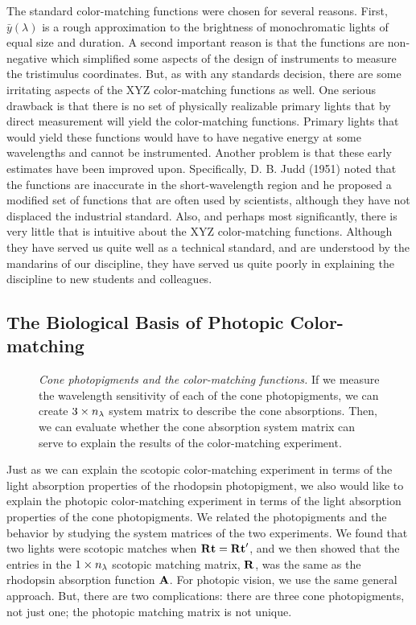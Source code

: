 The standard color-matching
functions were chosen for several reasons.
First, $\bar{y}(\lambda)$ is a rough approximation
to the brightness of monochromatic lights of equal size and duration.
A second important reason is that the
functions are non-negative
which simplified some aspects of the
design of instruments to measure the tristimulus coordinates.
But, as with any standards decision, there are some
irritating aspects of the XYZ color-matching functions
as well.
One serious drawback is that
there is no set of physically realizable primary lights
that by direct measurement will yield the color-matching functions.
Primary lights that would yield these functions
would have to have negative energy at some wavelengths
and cannot be instrumented.
Another problem is that these early estimates have been
improved upon.
Specifically, D. B. Judd (1951) noted that the functions are
inaccurate in the short-wavelength region and he proposed a
modified set of functions that are often used by scientists,
although they have not displaced the industrial standard.
Also, and perhaps most significantly,
there is very little that is intuitive about the XYZ
color-matching functions.
Although they have served us quite well as a technical standard,
and are understood by the mandarins of our discipline,
they have served us quite poorly in explaining the discipline
to new students and colleagues.

\subsection*{The Biological Basis of Photopic Color-matching}

\begin{figure}
\centerline {
}
\caption[Photoreceptors and Color Matching]{
{\em Cone photopigments and the color-matching functions.}
If we measure the wavelength sensitivity of
each of the cone photopigments, we can
create $3 \times \mbox{$n_\lambda$}$ system matrix to describe the cone absorptions.
Then, we can evaluate whether the
cone absorption system matrix can serve 
to explain the results of the color-matching experiment.
}
\label{f3:photoreceptor.mat}
\end{figure}
Just as we can explain the scotopic color-matching experiment
in terms of the light absorption properties of the rhodopsin photopigment,
we also would like to explain the photopic color-matching experiment
in terms of the light absorption properties of the cone photopigments.
We related the photopigments and the behavior by studying
the system matrices of the two experiments.
We found that two lights were scotopic matches when
$\mbox{$\bf R$} \mbox{${\bf t}$} = \mbox{$\bf R$} \mbox{${\bf t}$}'$,
and we then showed that the 
entries in the $1 \times \mbox{$n_\lambda$}$ scotopic matching
matrix, $\mbox{$\bf R$}$, was the same
as the rhodopsin absorption function $\mbox{$\bf A$}$.
For photopic vision, we use the same general approach.
But, there are two complications:
there are three cone photopigments, not just one;
the photopic matching matrix is not unique.

